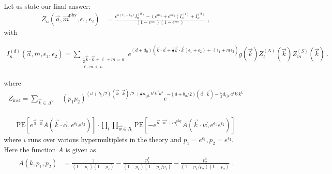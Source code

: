 \documentclass[letterpaper, 11pt]{article}
\newcommand{\nn}{\nonumber}
\def\a{\alpha}
\def\e{\epsilon}
\def\half{\frac{1}{2}}
\begin{document}
Let us state our final answer:
\begin{align}
 Z_n (\vec{a}, \vec{m}^{\textrm{phy}}, \e_1, \e_2) &= \frac{e^{n(\e_1 + \e_2)} I_n^{(0)} - (e^{n\e_1} + e^{n \e_2}) I_n^{(1)} + I_n^{(2)} }{(1-e^{n\e_1})(1-e^{n\e_2})} \ , 
\end{align}
with 




\begin{align}
  I_n^{(d)}(\vec{a}, m, \e_1, \e_2) = \sum_{\substack{\half \vec{k}\cdot\vec{k} + \ell + m = n \\ \ell, m < n}} e^{(d+d_0)\left( \vec{k} \cdot \vec{a} + \half \vec{k} \cdot \vec{k} (\e_1 + \e_2) + \ell \e_1 + m \e_2 \right)} g(\vec{k}) Z^{(N)}_{\ell}(\vec{k}) Z^{(S)}_m (\vec{k}) \ . 
  \end{align}

  

where
\begin{align}
  Z_{\text{inst}}=\sum_{\vec{k}\in\Delta^{\vee}}&\,(p_1p_2)^{(d+b_0/2)(\vec{k}\cdot\vec{k})/2+\frac{\kappa}{6}d_{ijk}\,k^ik^jk^k}e^{-(d+b_0/2)(\vec{a}\cdot\vec{k})-\frac{\kappa}{2}d_{ijk}\,a^ik^jk^k}\nn\\
\end{align}



\begin{align}
\textrm{PE} \left[ e^{\vec{a} \cdot \vec{\a}}A(\vec{k} \cdot \vec{\a}, e^{\e_1} e^{\e_2})\right]\cdot 
 \prod_{i} \prod_{\vec{w} \in R_i} 
\textrm{PE} \left[- e^{\vec{a} \cdot \vec{w} + m^{\textrm{phy}}_i}A(\vec{k} \cdot \vec{w}, e^{\e_1} e^{\e_2})\right]
\end{align} 
where $i$ runs over various hypermultiplets in the theory and $p_1 = e^{\e_1}, p_2 = e^{\e_2}$. Here the function $A$ is given as
\begin{align}
\begin{split}
 A(k, p_1, p_2) &= \frac{1}{(1-p_1)(1-p_2)} -  \frac{p_1^k}{(1-p_1)(1-p_2/p_1)} -  \frac{p_2^k}{(1-p_1/p_2)(1-p_2)}  \ . 
\end{split}
\end{align}
\end{document}
